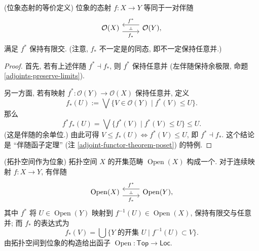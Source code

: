 \begin{prop}
	[label={morphism-of-locales-as-adjunction}]
	{(位象态射的等价定义)}
	位象的态射 $f\colon X\to Y$ 等同于一对伴随%
	\[\begin{tikzcd}[ampersand replacement=\&]
		{\mathcal O(X)} \& {\mathcal O(Y),}
		\arrow[""{name=0, anchor=center, inner sep=0}, "{f^*}"', shift right=2, from=1-2, to=1-1]
		\arrow[""{name=1, anchor=center, inner sep=0}, "{f_*}"', shift right=2, from=1-1, to=1-2]
		\arrow["\dashv"{anchor=center, rotate=-90}, draw=none, from=0, to=1]
	\end{tikzcd}\]
	满足 $f^*$ 保持有限交. (注意, $f_*$ 不一定是\fm{}的同态, 即不一定保持任意并.)
\end{prop}
\begin{proof}
	首先, 若有上述伴随 $f^*\dashv f_*$, 则 $f^*$ 保持任意并 (左伴随保持余极限, 命题 \ref{adjoints-preserve-limits}).
	
	另一方面, 若有映射 $f^*\colon \mathcal O(Y)\to\mathcal O(X)$ 保持任意并, 定义
	\[
	f_*(U) := \bigvee \{V\in\mathcal O(Y)\mid f^*(V)\leq U\}.
	\]
	那么
	\[
	f^*f_*(U) = \bigvee \{f^*(V)\mid f^*(V)\leq U\} \leq U.
	\]
	(这是伴随的余单位.)
	由此可得 $V\leq f_*(U) \Leftrightarrow f^*(V)\leq U$, 即 $f^*\dashv f_*$. 这个结论是 ``伴随函子定理'' (注 \ref{adjoint-functor-theorem-poset}) 的特例.
\end{proof}

\begin{example}
	{(拓扑空间作为位象)}
	拓扑空间 $X$ 的开集范畴 $\operatorname{Open}(X)$ 构成一个\fm{}.
	对于连续映射 $f \colon X \to Y$,
	有伴随
	\[\begin{tikzcd}[ampersand replacement=\&]
		{\operatorname{Open}(X)} \& {\operatorname{Open}(Y),}
		\arrow[""{name=0, anchor=center, inner sep=0}, "{f^*}"', shift right=2, from=1-2, to=1-1]
		\arrow[""{name=1, anchor=center, inner sep=0}, "{f_*}"', shift right=2, from=1-1, to=1-2]
		\arrow["\dashv"{anchor=center, rotate=-90}, draw=none, from=0, to=1]
	\end{tikzcd}\]
	其中 $f^*$ 将 $U\in\operatorname{Open}(Y)$ 映射到 $f^{-1}(U)\in\operatorname{Open}(X)$, 保持有限交与任意并; 而 $f_*$ 的表达式为
	\[
	f_*(V) = \bigcup \{\text{$Y$ 的开集 $U$} \mid f^{-1}(U)\subset V\}.
	\]
	由拓扑空间到位象的构造给出函子 $\operatorname{Open} \colon \mathsf {Top} \to \mathsf {Loc}.$
\end{example}

